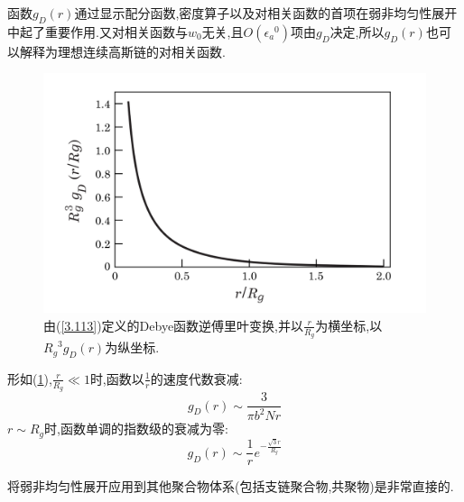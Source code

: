 函数$g_D(r)$通过显示配分函数,密度算子以及对相关函数的首项在弱非均匀性展开中起了重要作用.又对相关函数与$w_0$无关,且$O({\epsilon_a}^0)$项由$g_D$决定,所以$g_D(r)$也可以解释为理想连续高斯链的对相关函数.
\begin{figure}[H]
	\centering
	\includegraphics[scale=0.3]{./figures/FIG3-9.png}
	\caption{由(\ref{3.113})定义的Debye函数逆傅里叶变换,并以$\frac{r}{R_g}$为横坐标,以${R_g}^3 g_D(r)$为纵坐标.}
	\label{FIG3.9}
\end{figure}

形如(\ref{FIG3.9}),$\frac{r}{R_g} \ll 1$时,函数以$\frac{1}{r}$的速度代数衰减:
\begin{equation}
g_D(r) \sim \frac{3}{\pi b^2 N r}\label{3.137}
\end{equation}
$r \sim R_g$时,函数单调的指数级的衰减为零:
$$g_D(r) \sim \frac{1}{r} e^{-\frac{\sqrt{3}r}{R_g}}$$

将弱非均匀性展开应用到其他聚合物体系(包括支链聚合物,共聚物)是非常直接的.

